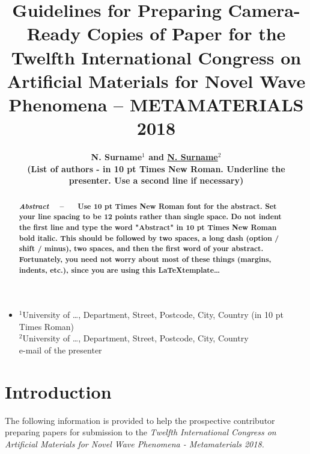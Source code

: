 \documentclass[10pt,a4paper]{article}
\begin{document}
\title{\large \textbf{Guidelines for Preparing Camera-Ready Copies of Paper for the Twelfth International Congress on Artificial Materials for Novel Wave Phenomena -- METAMATERIALS 2018}}
%
\def\affil#1{\begin{itemize} \item[] #1 \end{itemize}}
%
\author{\normalsize \bfseries N. Surname$^1$ and \underline{N. Surname}$^2$
\\ \small (List of authors - in 10 pt Times New Roman. Underline the presenter. Use a second line if necessary)}
%
\date{}
%
\maketitle
\thispagestyle{fancy} %
%
\vspace{-6ex}
\affil{\begin{center}\normalsize $^1$University of \dots, Department, Street, Postcode, City, Country (in 10 pt Times Roman)\\
$^2$University of \dots, Department, Street, Postcode, City, Country \\
e-mail of the presenter
 \end{center}}


\begin{abstract}
\noindent \normalsize
\textbf{\textit{Abstract} \ \ -- \ \
Use 10 pt Times New Roman font for the abstract. Set your line spacing to be 12 points rather than single space. Do not indent the first line and type the word "Abstract" in 10 pt Times New Roman bold italic. This should be followed by two spaces, a long dash (option / shift / minus), two spaces, and then the first word of your abstract. Fortunately, you need not worry about most of these things (margins, indents, etc.), since you are using this \LaTeX template\dots}
\end{abstract}


\section{Introduction}

The following information is provided to help the prospective contributor preparing papers for submission to the \emph{Twelfth International Congress on Artificial Materials for Novel Wave Phenomena - Metamaterials 2018.}
\end{document}
